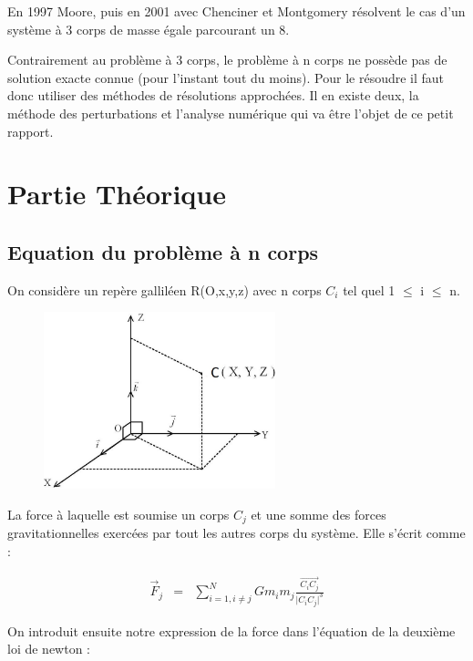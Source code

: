 \documentclass[a4paper]{article}
\begin{document}
En 1997 Moore, puis en 2001 avec Chenciner et Montgomery résolvent le cas d'un système à 3 corps de masse égale parcourant un 8.
\newline

Contrairement au problème à 3 corps, le problème à n corps ne possède pas de solution exacte connue (pour l'instant tout du moins). Pour le résoudre il faut donc utiliser des méthodes de résolutions approchées. Il en existe deux, la méthode des perturbations et l'analyse numérique qui va être l'objet de ce petit rapport.


\section{Partie Théorique}
\label{sec:Partie Théorique}

\subsection{Equation du problème à n corps}
On considère un repère galliléen R(O,x,y,z) avec n corps $C_{i}$ tel quel 1 $\le$ i $\le$ n.

\begin{figure}[h]
\centering
\includegraphics[width=0.6\textwidth]{R.jpg}
\caption{\label{fig:Repère R}}
\end{figure}

La force à laquelle est soumise un corps $C_{j}$ et une somme des forces gravitationnelles exercées par tout les autres corps du système. Elle s'écrit comme :

\begin{eqnarray*}
    \overrightarrow{F}_{j} &=& \sum_{i=1,i \ne j}^{N} Gm_{i}m_{j}\frac{\overrightarrow{C_{i}C_{j}}}{{|C_{i}C_{j}}|^3}
\end{eqnarray*}

On introduit ensuite notre expression de la force dans l'équation de la deuxième loi de newton :
\end{document}
